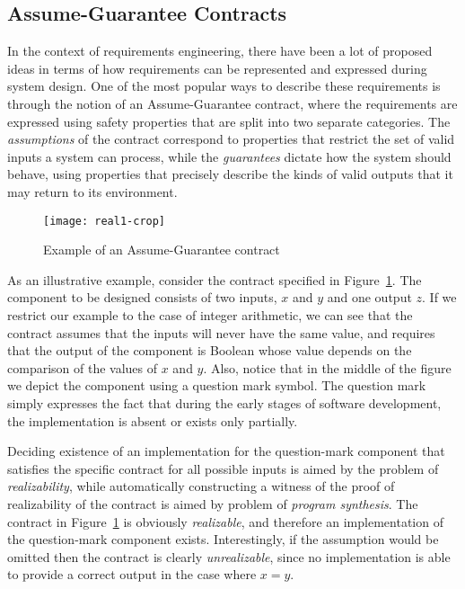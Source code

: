 \subsection{Assume-Guarantee Contracts}

In the context of requirements engineering, there have been a lot of proposed
ideas in terms of how requirements can be represented and expressed during
system design. 
One of the most popular ways to describe these requirements is through
the notion of an Assume-Guarantee contract, where the requirements are expressed
using safety properties that are split into two separate categories. The
\emph{assumptions} of the contract correspond to properties that restrict the
set of valid inputs a system can process, while the \emph{guarantees} dictate
how the system should behave, using properties that precisely describe
the kinds of valid outputs that it may return to its environment.

\begin{figure}[H]
	\centering
	\texttt{[image: real1-crop]}    	
	\caption{Example of an Assume-Guarantee contract}
	\label{fg:example}
\end{figure}

As an illustrative example, consider the contract specified in
Figure~\ref{fg:example}. The component to be designed consists of two inputs,
$x$ and $y$ and one output $z$. If we restrict our example to the case of integer arithmetic,
we can see that the contract assumes that the inputs will never have the same value,
and requires that the output of the component is Boolean 
whose value depends on the comparison of the values of $x$ and $y$.
Also, notice that in the middle of the figure we depict the component using a
question mark symbol. The question mark simply expresses the fact that during
the early stages of software development, the implementation is absent or exists only partially.

Deciding existence of an implementation for the question-mark component 
that satisfies the specific contract for all possible inputs is aimed by the problem of 
\emph{realizability}, while automatically constructing a witness  of the proof 
of realizability of the contract is aimed by problem of \emph{program synthesis}.
The contract in Figure~\ref{fg:example} is obviously
\emph{realizable}, and therefore an implementation of the question-mark component exists.
Interestingly, if the assumption would be omitted then 
the contract is clearly \emph{unrealizable}, since no implementation 
is able to provide a correct output in the case where $x=y$.

